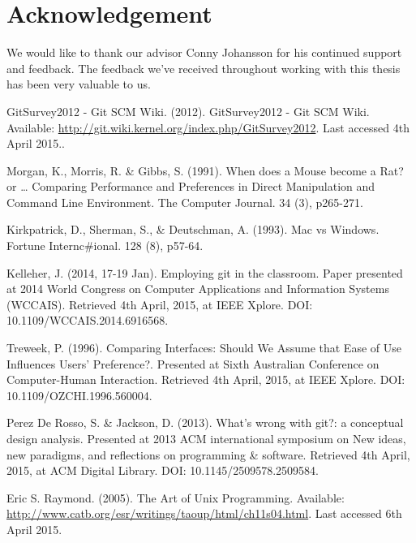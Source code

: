 \documentclass[a4paper,oneside]{bth} %
\begin{document}
		\chapter*{Acknowledgement}
		We would like to thank our advisor Conny Johansson for his continued support and feedback. The feedback we've received throughout working with this thesis has been very valuable to us.
		
		\newpage
		\begin{thebibliography}{1}
			
			GitSurvey2012 - Git SCM Wiki. (2012). GitSurvey2012 - Git SCM Wiki. Available: \url{http://git.wiki.kernel.org/index.php/GitSurvey2012}. Last accessed 4th April 2015..
			
			Morgan, K., Morris, R. \& Gibbs, S. (1991). When does a Mouse become a Rat? or … Comparing Performance and Preferences in Direct Manipulation and Command Line Environment. The Computer Journal. 34 (3), p265-271.
			
			Kirkpatrick, D., Sherman, S., \& Deutschman, A. (1993). Mac vs Windows. Fortune Internc\#ional. 128 (8), p57-64.
			
			Kelleher, J. (2014, 17-19 Jan). Employing git in the classroom. Paper presented at 2014 World Congress on Computer Applications and Information Systems (WCCAIS). Retrieved 4th April, 2015, at IEEE Xplore. DOI: 10.1109/WCCAIS.2014.6916568.
			
			Treweek, P. (1996). Comparing Interfaces: Should We Assume that Ease of Use Influences Users' Preference?. Presented at Sixth Australian Conference on Computer-Human Interaction. Retrieved 4th April, 2015, at IEEE Xplore. DOI: 10.1109/OZCHI.1996.560004.
			
			
			Perez De Rosso, S. \& Jackson, D. (2013). What's wrong with git?: a conceptual design analysis. Presented at 2013 ACM international symposium on New ideas, new paradigms, and reflections on programming \& software. Retrieved 4th April, 2015, at ACM Digital Library. DOI: 10.1145/2509578.2509584.
			
			Eric S. Raymond. (2005). The Art of Unix Programming.
			Available: \url{http://www.catb.org/esr/writings/taoup/html/ch11s04.html}.
			Last accessed 6th April 2015.
			

\end{thebibliography}
\end{document}
